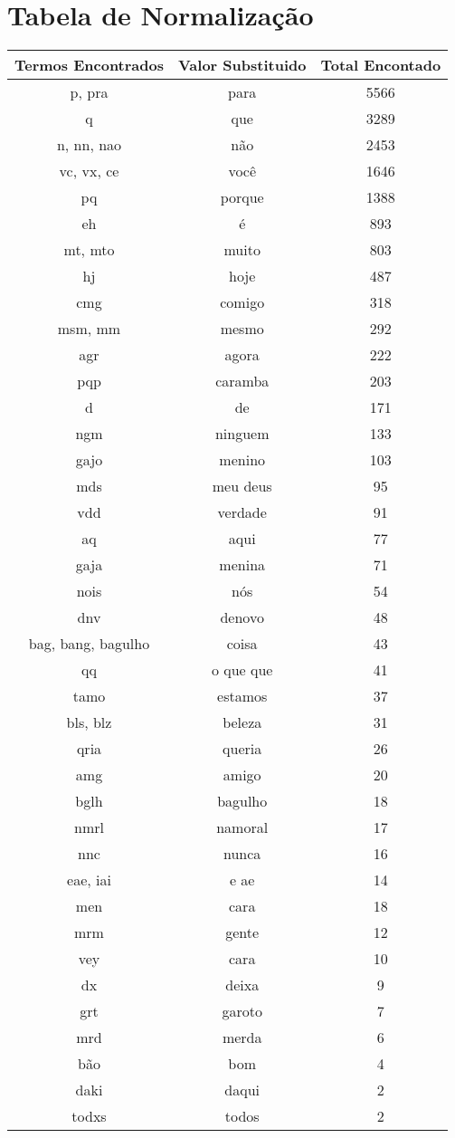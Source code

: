 \chapter{Tabela de Normalização}
\label{app:tabelanorm}

\begin{table}[]
\begin{tabular}{c|c|c}
\textbf{Termos Encontrados} & \textbf{Valor Substituido} & \textbf{Total Encontado} \\ \hline
p, pra & para & 5566 \\
q & que & 3289 \\
n, nn, nao & não & 2453 \\
vc, vx, ce & você & 1646 \\
pq & porque & 1388 \\
eh & é & 893 \\
mt, mto & muito & 803 \\
hj & hoje & 487 \\
cmg & comigo & 318 \\
msm, mm & mesmo & 292 \\
agr & agora & 222 \\
pqp & caramba & 203 \\
d & de & 171 \\
ngm & ninguem & 133 \\
gajo & menino & 103 \\
mds & meu deus & 95 \\
vdd & verdade & 91 \\
aq & aqui & 77 \\
gaja & menina & 71 \\
nois & nós & 54 \\
dnv & denovo & 48 \\
bag, bang, bagulho & coisa & 43 \\
qq & o que que & 41 \\
tamo & estamos & 37 \\
bls, blz & beleza & 31 \\
qria & queria & 26 \\
amg & amigo & 20 \\
bglh & bagulho & 18 \\
nmrl & namoral & 17 \\
nnc & nunca & 16 \\
eae, iai & e ae & 14 \\
men & cara & 18 \\
mrm & gente & 12 \\
vey & cara & 10 \\
dx & deixa & 9 \\
grt & garoto & 7 \\
mrd & merda & 6 \\
bão & bom & 4 \\
daki & daqui & 2 \\
todxs & todos & 2
\end{tabular}
\end{table}